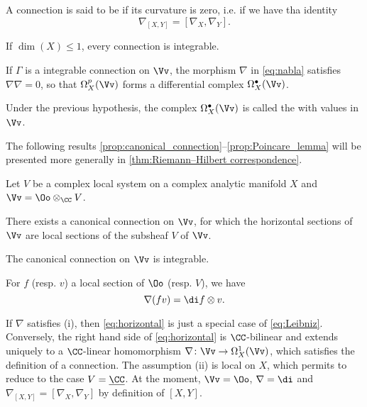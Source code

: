 \begin{definition}\label{defn:integrable_connections}
  A connection is said to be  if its curvature is zero, i.e.
  if we have tha identity
  \[
  \nabla_{[X,Y]} = [\nabla_X,\nabla_Y].
  \]
\end{definition}
If $\dim(X)\le 1$, every connection is integrable.

If $\Gamma$ is a integrable connection on $\Vv$, the morphism $\nabla$ in
\cref{eq:nabla} satisfies $\nabla\nabla=0$, so that $\Omega_X^p(\Vv)$ forms
a differential complex $\Omega_X^\bullet(\Vv)$.
\begin{definition}\label{defn:DeRhamComplex}
  Under the previous hypothesis, the complex $\Omega_X^\bullet(\Vv)$ is called
  the  with values in $\Vv$.
\end{definition}

The following results
\ref{prop:canonical_connection}--\ref{prop:Poincare_lemma}
will be presented more generally in \ref{thm:Riemann–Hilbert correspondence}.

\begin{proposition}\label{prop:canonical_connection}
  Let $V$ be a complex local system on a complex analytic manifold $X$ and
  $\Vv=\Oo\otimes_\CC V$.
  \begin{proplist}
    \item There exists a canonical connection on $\Vv$, for which the horizontal
    sections of $\Vv$ are local sections of the subsheaf $V$ of $\Vv$.
    \item The canonical connection on $\Vv$ is integrable.
    \item For $f$ (resp. $v$) a local section of $\Oo$ (resp. $V$), we have
    \begin{equation}\label{eq:horizontal}
      \nabla(fv)=\di f\otimes v.
    \end{equation}
  \end{proplist}
\end{proposition}

If $\nabla$ satisfies (i), then \cref{eq:horizontal} is just a special case
of \cref{eq:Leibniz}. Conversely, the right hand side of \cref{eq:horizontal}
is $\CC$-bilinear and extends uniquely to a $\CC$-linear homomorphism
$\nabla\colon\Vv\to\Omega_X^1(\Vv)$, which satisfies the definition of a
connection. The assumption (ii) is local on $X$, which permits to reduce to the
case $V=\underline{\CC}$. At the moment, $\Vv=\Oo$, $\nabla=\di$ and
$\nabla_{[X,Y]}=[\nabla_X,\nabla_Y]$ by definition of $[X,Y]$.

